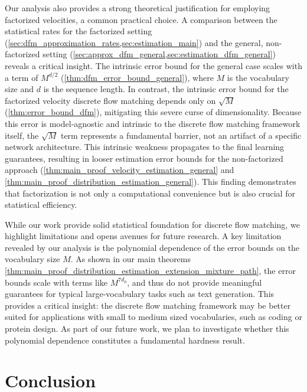 \documentclass[12pt]{article}
\numberwithin{equation}{section}
\theoremstyle{theoremstyle}
\numberwithin{equation}{section}
\numberwithin{theorem}{section}
\numberwithin{proposition}{section}
\numberwithin{definition}{section}
\numberwithin{lemma}{section}
\numberwithin{assumption}{section}
\numberwithin{remark}{section}
\begin{document}
Our analysis also provides a strong theoretical justification for employing factorized velocities, a common practical choice. 
A comparison between the statistical rates for the factorized setting (\cref{sec:dfm_approximation_rates,sec:estimation_main}) and the general, non-factorized setting (\cref{sec:approx_dfm_general,sec:estimation_dfm_general}) reveals a critical insight. 
The intrinsic error bound for the general case scales with a term of $M^{d/2}$ (\cref{thm:dfm_error_bound_general}), where $M$ is the vocabulary size and $d$ is the sequence length. 
In contrast, the intrinsic error bound for the factorized velocity discrete flow matching depends only on $\sqrt{M}$ (\cref{thm:error_bound_dfm}), mitigating this severe curse of dimensionality.
Because this error is model-agnostic and intrinsic to the discrete flow matching framework itself, the $\sqrt{M}$ term represents a fundamental barrier, not an artifact of a specific network architecture. 
This intrinsic weakness propagates to the final learning guarantees, resulting in looser estimation error bounds for the non-factorized approach (\cref{thm:main_proof_velocity_estimation_general} and \cref{thm:main_proof_distribution_estimation_general}).
This finding demonstrates that factorization is not only a computational convenience but is also crucial for statistical efficiency.

While our work provide solid statistical foundation for discrete flow matching, we highlight limitations and opens avenues for future research. 
A key limitation revealed by our analysis is the polynomial dependence of the error bounds on the vocabulary size $M$. 
As shown in our main theorems \cref{thm:main_proof_distribution_estimation_extension_mixture_path}, the error bounds scale with terms like $ M^{7d_0}$, and thus do not provide meaningful guarantees for typical large-vocabulary tasks such as text generation. 
This provides a critical insight: the discrete flow matching framework may be better suited for applications with small to medium sized vocabularies, such as coding or protein design. 
As part of our future work, we plan to investigate whether this polynomial dependence constitutes a fundamental hardness result.






\vspace{-2mm}
\section{Conclusion}
\label{sec:conclusion}
\vspace{-3mm}
\end{document}

